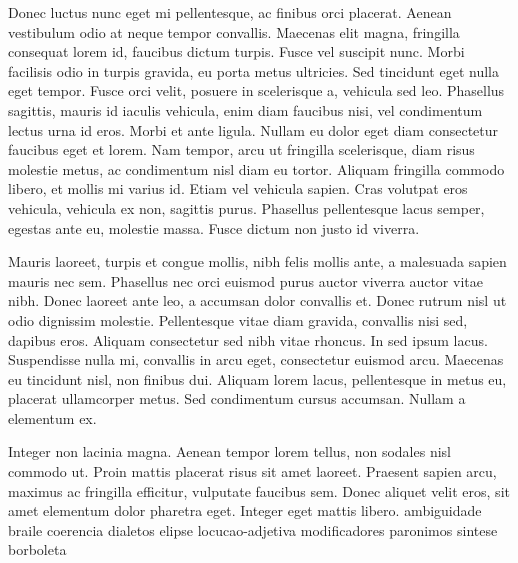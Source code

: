 Donec luctus nunc eget mi pellentesque, ac finibus orci placerat. Aenean vestibulum odio at neque tempor convallis. Maecenas elit magna, fringilla consequat lorem id, faucibus dictum turpis. Fusce vel suscipit nunc. Morbi facilisis odio in turpis gravida, eu porta metus ultricies. Sed tincidunt eget nulla eget tempor. Fusce orci velit, posuere in scelerisque a, vehicula sed leo. Phasellus sagittis, mauris id iaculis vehicula, enim diam faucibus nisi, vel condimentum lectus urna id eros. Morbi et ante ligula. Nullam eu dolor eget diam consectetur faucibus eget et lorem. Nam tempor, arcu ut fringilla scelerisque, diam risus molestie metus, ac condimentum nisl diam eu tortor. Aliquam fringilla commodo libero, et mollis mi varius id. Etiam vel vehicula sapien. Cras volutpat eros vehicula, vehicula ex non, sagittis purus. Phasellus pellentesque lacus semper, egestas ante eu, molestie massa. Fusce dictum non justo id viverra.


	\begin{quadro}[ht!]
		\centering
	\end{quadro}

Mauris laoreet, turpis et congue mollis, nibh felis mollis ante, a malesuada sapien mauris nec sem. Phasellus nec orci euismod purus auctor viverra auctor vitae nibh. Donec laoreet ante leo, a accumsan dolor convallis et. Donec rutrum nisl ut odio dignissim molestie. Pellentesque vitae diam gravida, convallis nisi sed, dapibus eros. Aliquam consectetur sed nibh vitae rhoncus. In sed ipsum lacus. Suspendisse nulla mi, convallis in arcu eget, consectetur euismod arcu. Maecenas eu tincidunt nisl, non finibus dui. Aliquam lorem lacus, pellentesque in metus eu, placerat ullamcorper metus. Sed condimentum cursus accumsan. Nullam a elementum ex.

Integer non lacinia magna. Aenean tempor lorem tellus, non sodales nisl commodo ut. Proin mattis placerat risus sit amet laoreet. Praesent sapien arcu, maximus ac fringilla efficitur, vulputate faucibus sem. Donec aliquet velit eros, sit amet elementum dolor pharetra eget. Integer eget mattis libero.
\Gls{ambiguidade}
\Gls{braile}
\Gls{coerencia}
\Gls{dialetos}
\Gls{elipse}
\Gls{locucao-adjetiva}
\Gls{modificadores}
\Gls{paronimos}
\Gls{sintese}
\Gls{borboleta}
